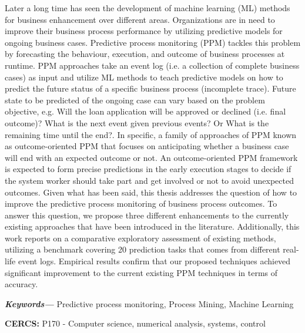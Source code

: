 
\providecommand{\keywords}[1]
{
	\small	
	\textbf{\textit{Keywords---}} #1
}

\begin{abstracts}        %
	Later a long time has seen the development of machine learning (ML) methods for business enhancement over different areas. Organizations are in need to improve their business process performance by utilizing predictive models for ongoing business cases. Predictive process monitoring (PPM) tackles this problem by forecasting the behaviour, execution, and outcome of business processes at runtime. PPM approaches take an event log (i.e. a collection of complete business cases) as input and utilize ML methods to teach predictive models on how to predict the future status of a specific business process (incomplete trace). Future state to be predicted of the ongoing case can vary based on the problem objective, e.g. Will the loan application will be approved or declined (i.e. final outcome)? What is the next event given previous events? Or What is the remaining time until the end?. In specific, a family of approaches of PPM known as outcome-oriented PPM that focuses on anticipating whether a business case will end with an expected outcome or not. An outcome-oriented PPM framework is expected to form precise predictions in the early execution stages to decide if the system
	worker should take part and get involved or not to avoid unexpected outcomes. Given what has been said, this thesis addresses the question of how to improve the predictive process monitoring of business process outcomes. To answer this question, we propose three different enhancements to the currently existing approaches that have been introduced in the literature. Additionally, this work reports on a comparative exploratory assessment of existing methods, utilizing a benchmark covering 20 prediction tasks that comes from different real-life event logs. Empirical results confirm that our proposed techniques achieved significant improvement to the current existing PPM techniques in terms of accuracy.
	
	
\keywords{Predictive process monitoring, Process Mining,  Machine Learning}

\textbf{CERCS:} P170 -  Computer science, numerical analysis, systems, control \\


\end{abstracts}
